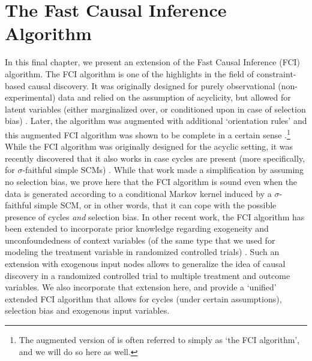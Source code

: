 \section{The Fast Causal Inference Algorithm}\label{sec:fci}


In this final chapter, we present an extension of the Fast Causal Inference (FCI) algorithm. 
The FCI algorithm is one of the highlights in the field of constraint-based causal discovery.
It was originally designed for purely observational (non-experimental) data and relied on the assumption of acyclicity, but allowed for latent variables (either marginalized over, or conditioned upon in case of selection bias) \cite{SMR1995,SMR1999}.
Later, the algorithm was augmented with additional `orientation rules' and this augmented FCI algorithm was shown to be complete in a certain sense \cite{Zhang2008_AI}.\footnote{The augmented version of \cite{Zhang2008_AI} is often referred to simply as `the FCI algorithm', and we will do so here as well.}
While the FCI algorithm was originally designed for the acyclic setting, it was recently discovered that it also works in case cycles are present (more specifically, for $\sigma$-faithful simple SCMs) \cite{MooijClaassen_UAI_20}.
While that work made a simplification by assuming no selection bias, we prove here that the FCI algorithm is sound even when the data is generated according to a conditional Markov kernel induced by a $\sigma$-faithful simple SCM, or in other words, that it can cope with the possible presence of cycles \emph{and} selection bias.
In other recent work, the FCI algorithm has been extended to incorporate prior knowledge regarding exogeneity and unconfoundedness of context variables (of the same type that we used for modeling the treatment variable in randomized controlled trials) \cite{Mooij++_JMLR_20}.
Such an extension with exogenous input nodes allows to generalize the idea of causal discovery in a randomized controlled trial to multiple treatment and outcome variables.
We also incorporate that extension here, and provide a `unified' extended FCI algorithm that allows for cycles (under certain assumptions), selection bias and exogenous input variables.


